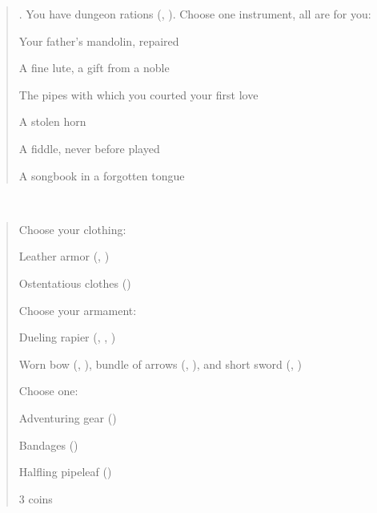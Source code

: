 \documentclass[8pt]{extarticle}
\begin{document}
\begin{multicols}{2}

\begin{quote}
  . You have dungeon rations (,
  ). Choose one instrument, all are 
  for you:

  \begin{choices}
  \item Your father’s mandolin, repaired
  \item A fine lute, a gift from a noble
  \item The pipes with which you courted your first love
  \item A stolen horn
  \item A fiddle, never before played
  \item A songbook in a forgotten tongue
  \end{choices}

\end{quote}
\vfill\null

\ 

\columnbreak
\begin{quote}
  Choose your clothing:

  \begin{choices}
  \item Leather armor (, )
  \item Ostentatious clothes ()
  \end{choices}

  Choose your armament:

  \begin{choices}
  \item Dueling rapier (, , )
  \item Worn bow (, ), bundle of arrows
    (, ), and short sword (,
    )
  \end{choices}

  Choose one:

  \begin{choices}
  \item Adventuring gear ()
  \item Bandages ()
  \item Halfling pipeleaf ()
  \item 3 coins
  \end{choices}

\end{quote}

\end{multicols}
\end{document}
